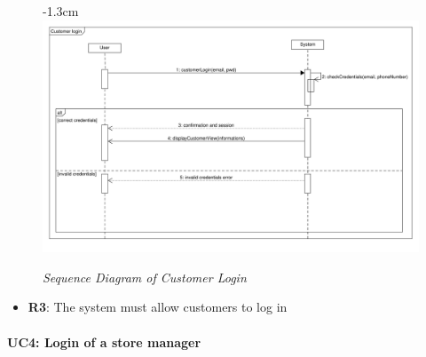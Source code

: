 \documentclass{article}
\begin{document}
\begin{center}
					\begin{figure}[!h]
						\begin{adjustwidth} {-1.3cm}{}
							\centering
							\includegraphics[scale=0.36]{SD/3_customerLogin.pdf}\\
							\caption{\emph{Sequence Diagram of Customer Login}}
						\end{adjustwidth}
					\end{figure}

					\begin{itemize}
					\bigskip
					\bigskip
					\bigskip
					 {\bfseries Required functional requirements: }
					\item {\bfseries R3}: The system must allow customers to log in

					\end{itemize}

				\end{center}
			
					\bigskip
					\bigskip
					\bigskip
			\paragraph{UC4: Login of a store manager}
			
\end{document}
